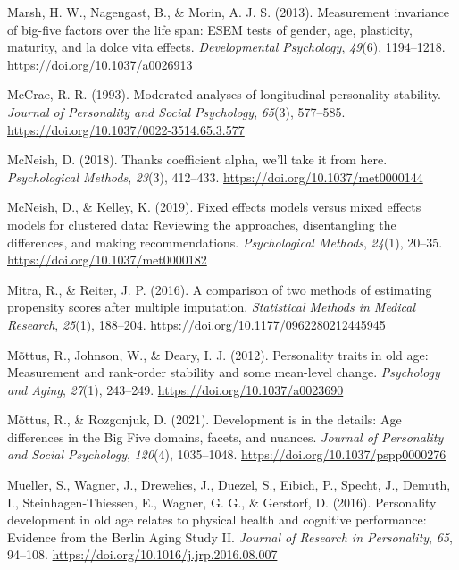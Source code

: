 \documentclass[
  english,
  man, noextraspace]{apa7}
\begin{document}
\leavevmode\hypertarget{ref-marshMeasurementInvarianceBigfive2013}{}%
Marsh, H. W., Nagengast, B., \& Morin, A. J. S. (2013). Measurement invariance of big-five factors over the life span: ESEM tests of gender, age, plasticity, maturity, and la dolce vita effects. \emph{Developmental Psychology}, \emph{49}(6), 1194--1218. \url{https://doi.org/10.1037/a0026913}

\leavevmode\hypertarget{ref-mccraeModeratedAnalysesLongitudinal1993}{}%
McCrae, R. R. (1993). Moderated analyses of longitudinal personality stability. \emph{Journal of Personality and Social Psychology}, \emph{65}(3), 577--585. \url{https://doi.org/10.1037/0022-3514.65.3.577}

\leavevmode\hypertarget{ref-mcneishThanksCoefficientAlpha2018}{}%
McNeish, D. (2018). Thanks coefficient alpha, we'll take it from here. \emph{Psychological Methods}, \emph{23}(3), 412--433. \url{https://doi.org/10.1037/met0000144}

\leavevmode\hypertarget{ref-mcneishFixedEffectsModels2019}{}%
McNeish, D., \& Kelley, K. (2019). Fixed effects models versus mixed effects models for clustered data: Reviewing the approaches, disentangling the differences, and making recommendations. \emph{Psychological Methods}, \emph{24}(1), 20--35. \url{https://doi.org/10.1037/met0000182}

\leavevmode\hypertarget{ref-mitraComparisonTwoMethods2016}{}%
Mitra, R., \& Reiter, J. P. (2016). A comparison of two methods of estimating propensity scores after multiple imputation. \emph{Statistical Methods in Medical Research}, \emph{25}(1), 188--204. \url{https://doi.org/10.1177/0962280212445945}

\leavevmode\hypertarget{ref-mottusPersonalityTraitsOld2012}{}%
Mõttus, R., Johnson, W., \& Deary, I. J. (2012). Personality traits in old age: Measurement and rank-order stability and some mean-level change. \emph{Psychology and Aging}, \emph{27}(1), 243--249. \url{https://doi.org/10.1037/a0023690}

\leavevmode\hypertarget{ref-mottusDevelopmentDetailsAge2021}{}%
Mõttus, R., \& Rozgonjuk, D. (2021). Development is in the details: Age differences in the Big Five domains, facets, and nuances. \emph{Journal of Personality and Social Psychology}, \emph{120}(4), 1035--1048. \url{https://doi.org/10.1037/pspp0000276}

\leavevmode\hypertarget{ref-muellerPersonalityDevelopmentOld2016}{}%
Mueller, S., Wagner, J., Drewelies, J., Duezel, S., Eibich, P., Specht, J., Demuth, I., Steinhagen-Thiessen, E., Wagner, G. G., \& Gerstorf, D. (2016). Personality development in old age relates to physical health and cognitive performance: Evidence from the Berlin Aging Study II. \emph{Journal of Research in Personality}, \emph{65}, 94--108. \url{https://doi.org/10.1016/j.jrp.2016.08.007}
\end{document}
